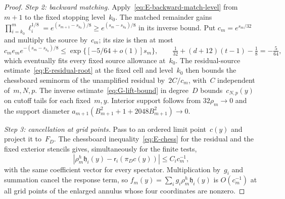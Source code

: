 \begin{proof}
\emph{Step 2: backward matching.} Apply~\eqref{eq:E-backward-match-level} from~$m+1$ to the fixed stopping level~$k_0$. The matched remainder gains $\prod_{i=k_0}^{m}\ell_i^{1/8}=e^{(s_{m+1}-s_{k_0})/8}\ge e^{(s_m-s_{k_0})/8}$ in its inverse bound. Put $c_m=e^{s_m/32}$ and multiply the source by~$c_m$; its size is then at most
\begin{equation*}
c_me_me^{-(s_m-s_{k_0})/8}
\le\exp\{[-5/64+o(1)]s_m\},\qquad
\tfrac1{32}+(d+12)(t-1)-\tfrac18=-\tfrac5{64},
\end{equation*}
which eventually fits every fixed source allowance at~$k_0$. The residual-source estimate~\eqref{eq:E-residual-root} at the fixed cell and level~$k_0$ then bounds the chessboard seminorm of the unamplified residual by~$2C/c_m$, with~$C$ independent of~$m,N,p$. The inverse estimate~\eqref{eq:G-lift-bound} in degree~$D$ bounds~$c_{N,p}(y)$ on cutoff tails for each fixed~$m,y$. Interior support follows from $32\rho_m\to0$ and the support diameter $a_{m+1}(B_{m+1}^2+1+2048B_{m+1}^2)\to0$.

\emph{Step 3: cancellation at grid points.} Pass to an ordered limit point~$c(y)$ and project it to~$F_D$. The chessboard inequality~\eqref{eq:E-chess} for the residual and the fixed exterior stencils gives, simultaneously for the finite tests,
\begin{equation*}
|\rho_m^h\mathfrak h_i(y)-\mathsf r_i(\pi_Dc(y))|\le C_i c_m^{-1},
\end{equation*}
with the same coefficient vector for every spectator. Multiplication by~$g_i$ and summation cancel the response term, so $f_m(y)=\sum_i g_i\rho_m^h\mathfrak h_i(y)$ is $O(c_m^{-1})$ at all grid points of the enlarged annulus whose four coordinates are nonzero.


\end{proof}
